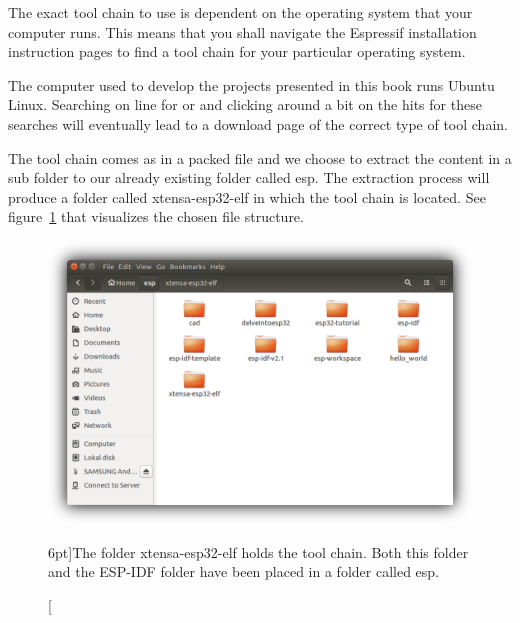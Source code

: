 \documentclass{tufte-book}
\begin{document}
The exact tool chain to use is dependent on the operating system that your computer runs. This means that you shall navigate the Espressif installation instruction pages to find a tool chain for your particular operating system.


The computer used to develop the projects presented in this book runs Ubuntu Linux. Searching on line for  or  and clicking around a bit on the hits for these searches will eventually lead to a download page of the correct type of tool chain.

The tool chain comes as in a packed file and we choose to extract the content in a sub folder to our already existing folder called esp. The extraction process will produce a folder called xtensa-esp32-elf in which the tool chain is located. See figure~\ref{fig:tool_chain_folder_shadowed} that visualizes the chosen file structure.

\begin{figure}
	\includegraphics{tool_chain_folder_shadowed.png}
	\caption[ $n$.][6pt]{The folder xtensa-esp32-elf holds the tool chain. Both this folder and the ESP-IDF folder have been placed in a folder called esp.}
	\label{fig:tool_chain_folder_shadowed}
\end{figure}

\end{document}
